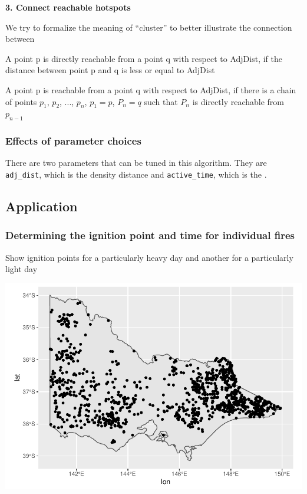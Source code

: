 \textbf{3. Connect reachable hotspots}

We try to formalize the meaning of ``cluster'' to better illustrate the
connection between

\begin{defn} A point p is directly reachable from a point q with respect to AdjDist, if the distance between point p and q is less or equal to AdjDist\end{defn}

\begin{defn}[reachable] A point p is reachable from a point q with respect to AdjDist, if there is a chain of points $p_1$, $p_2$, ..., $p_n$, $p_1 = p$, $P_n = q$ such that $P_n$ is directly reachable from $p_{n-1}$ \end{defn}

\hypertarget{effects-of-parameter-choices}{%
\subsubsection{Effects of parameter
choices}\label{effects-of-parameter-choices}}

There are two parameters that can be tuned in this algorithm. They are
\texttt{adj\_dist}, which is the density distance and
\texttt{active\_time}, which is the .

\hypertarget{application}{%
\subsection{Application}\label{application}}

\hypertarget{determining-the-ignition-point-and-time-for-individual-fires}{%
\subsubsection{Determining the ignition point and time for individual
fires}\label{determining-the-ignition-point-and-time-for-individual-fires}}

Show ignition points for a particularly heavy day and another for a
particularly light day

\begin{Schunk}

\includegraphics[width=0.8\linewidth]{clustering_paper_files/figure-latex/unnamed-chunk-3-1} \end{Schunk}

